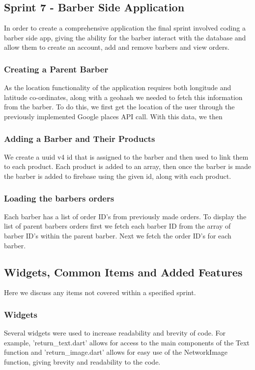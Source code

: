\documentclass[12pt]{article}
\begin{document}
	\subsection{Sprint 7 - Barber Side Application}
	\label{barber-application}
	In order to create a comprehensive application the final sprint involved coding a barber side app, giving the ability for the barber interact with the database and allow them to create an account, add and remove barbers and view orders.
	
	\subsubsection{Creating a Parent Barber}
	As the location functionality of the application requires both longitude and latitude co-ordinates, along with a geohash we needed to fetch this information from the barber. To do this, we first get the location of the user through the previously implemented Google places API call. With this data, we then 
	
	\subsubsection{Adding a Barber and Their Products}
	We create a uuid v4 id that is assigned to the barber and then used to link them to each product. Each product is added to an array, then once the barber is made the barber is added to firebase using the given id, along with each product. 
	
	\subsubsection{Loading the barbers orders}
	Each barber has a list of order ID's from previously made orders. To display the list of parent barbers orders first we fetch each barber ID from the array of barber ID's within the parent barber. Next we fetch the order ID's for each barber.
	
	\subsection{Widgets, Common Items and Added Features}
	Here we discuss any items not covered within a specified sprint.
	
	\subsubsection{Widgets}
	Several widgets were used to increase readability and brevity of code. For example, 'return\_text.dart' allows for access to the main components of the Text function and 'return\_image.dart' allows for easy use of the NetworkImage function, giving brevity and readability to the code.
	
\end{document}
